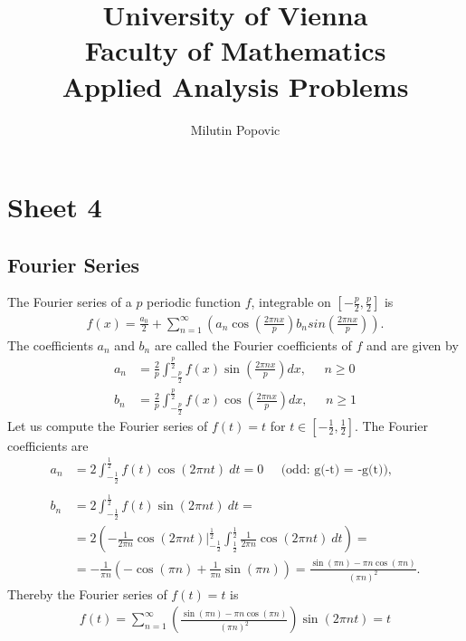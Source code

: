 \documentclass[a4paper]{article}
\title{University of Vienna\\ Faculty of Mathematics\\
\vspace{1cm}Applied Analysis Problems
}
\author{Milutin Popovic}
\begin{document}
\maketitle
\tableofcontents

\section{Sheet 4}

\subsection{Fourier Series}
The Fourier series of a $p$ periodic function $f$, integrable on
$[-\frac{p}{2}, \frac{p}{2}]$ is
\begin{align}
    f(x) = \frac{a_0}{2} + \sum_{n=1}^\infty \left(a_n \cos(\frac{2\pi n x}{p})
    b_n sin(\frac{2\pi n x}{p})\right).
\end{align}
The coefficients $a_n$ and $b_n$ are called the Fourier coefficients of $f$
and are given by
\begin{align}
    a_n &= \frac{2}{p} \int_{-\frac{p}{2}}^{\frac{p}{2}} f(x) \sin(\frac{2\pi
    n x}{p}) dx, \;\;\;\;\; n\geq 0 \\
    b_n &= \frac{2}{p} \int_{-\frac{p}{2}}^{\frac{p}{2}} f(x) \cos(\frac{2\pi
    n x}{p}) dx, \;\;\;\;\; n\geq 1
\end{align}
Let us compute the Fourier series of $f(t) = t$ for $t \in [-\frac{1}{2},
\frac{1}{2}]$. The Fourier coefficients are
\begin{align}
    a_n &= 2\int_{-\frac{1}{2}}^{\frac{1}{2}} f(t) \cos(2\pi n t)\ dt = 0
    \;\;\;\;\; \text{(odd: g(-t) = -g(t))},\\
    \nonumber\\
    b_n &= 2\int_{-\frac{1}{2}}^{\frac{1}{2}} f(t) \sin(2\pi n t)\ dt = \\
        &= 2 \left(-\frac{1}{2\pi n} \cos(2\pi n
        t)\bigg|_{-\frac{1}{2}}^{\frac{1}{2}}
        \int_{\frac{1}{2}}^{\frac{1}{2}} \frac{1}{2 \pi n}\cos(2\pi n t)\ dt
            \right) =\\
        &= -\frac{1}{\pi n}\left( -\cos(\pi n) + \frac{1}{\pi n }\sin(\pi
            n)\right) =
        \frac{\sin(\pi n) - \pi n \cos(\pi n)}{(\pi n)^2}.
\end{align}
Thereby the Fourier series of $f(t) = t$ is
\begin{align}
    f(t) = \sum_{n=1}^\infty \left(\frac{\sin(\pi n) - \pi n \cos(\pi n)}{(\pi
    n)^2}\right) \sin(2\pi n t) = t
\end{align}
\end{document}
